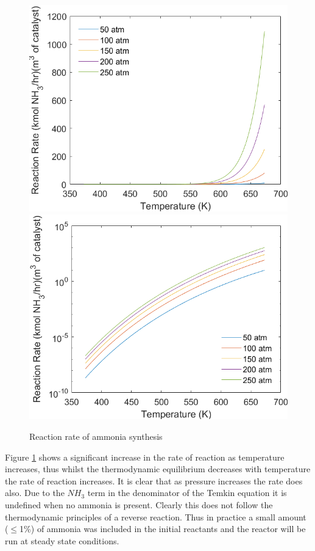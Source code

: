 \documentclass[11pt, a4paper]{article}
\begin{document}
{{\begin{figure}[h]
		\centering
		{\centering	
		\includegraphics[scale=0.455]{reactionrate1}
		\includegraphics[scale=0.455]{LOGreactionrate1}	
		\caption{Reaction rate of ammonia synthesis}
		}
\label{fig:rateGraph}
\end{figure}}


Figure \ref{fig:rateGraph} shows a significant increase in the rate of reaction as temperature increases, thus whilst the thermodynamic equilibrium decreases with temperature the rate of reaction increases. It is clear that as pressure increases the rate does also. Due to the $NH_3$ term in the denominator of the Temkin equation it is undefined when no ammonia is present. Clearly this does not follow the thermodynamic principles of a reverse reaction. Thus in practice a small amount ($\leq$1\%) of ammonia was included in the initial reactants and the reactor will be run at steady state conditions.

}
\end{document}
